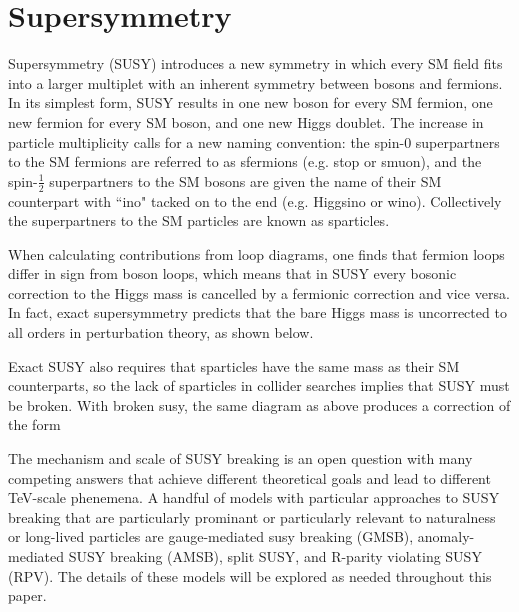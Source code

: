 \documentclass[12pt]{article}
\begin{document}
\section{Supersymmetry}
    Supersymmetry (SUSY) introduces a new symmetry in which every SM field fits into a larger multiplet with an inherent symmetry between bosons and fermions. In its simplest form, SUSY results in one new boson for every SM fermion, one new fermion for every SM boson, and one new Higgs doublet. The increase in particle multiplicity calls for a new naming convention: the spin-0 superpartners to the SM fermions are referred to as sfermions (e.g. stop or smuon), and the spin-$\frac{1}{2}$ superpartners to the SM bosons are given the name of their SM counterpart with ``ino" tacked on to the end (e.g. Higgsino or wino). Collectively the superpartners to the SM particles are known as sparticles.  

    When calculating contributions from loop diagrams, one finds that fermion loops differ in sign from boson loops, which means that in SUSY every bosonic correction to the Higgs mass is cancelled by a fermionic correction and vice versa. In fact, exact supersymmetry predicts that the bare Higgs mass is uncorrected to all orders in perturbation theory, as shown below.
    

    Exact SUSY also requires that sparticles have the same mass as their SM counterparts, so the lack of sparticles in collider searches implies that SUSY must be broken. With broken susy, the same diagram as above produces a correction of the form

    
    The mechanism and scale of SUSY breaking is an open question with many competing answers that achieve different theoretical goals and lead to different TeV-scale phenemena. A handful of models with particular approaches to SUSY breaking that are particularly prominant or particularly relevant to naturalness or long-lived particles are gauge-mediated susy breaking (GMSB), anomaly-mediated SUSY breaking (AMSB), split SUSY, and R-parity violating SUSY (RPV). The details of these models will be explored as needed throughout this paper.
\end{document}
